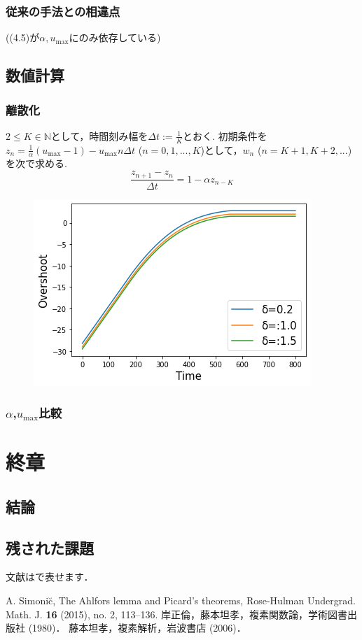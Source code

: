\documentclass [dvipdfmx] {jsarticle}
\numberwithin{equation}{section}
\theoremstyle{definition} %
\theoremstyle{definition} %
\begin{document}
\subsubsection{従来の手法との相違点}
((4.5)が$\alpha,u_{\max}$にのみ依存している)


\subsection{数値計算}


\subsubsection{離散化}
$2\le K\in\mathbb{N}$として，時間刻み幅を$\Delta t:=\frac{1}{K}$とおく.
初期条件を$z_n=\frac{1}{\alpha} (u_{\max}-1)-u_{\max} n \Delta t$ ($n=0,1,...,K$)として，$w_n$ ($n=K+1,K+2,...$)
を次で求める.
\begin{equation}
    \displaystyle\frac{z_{n+1}-z_n}{\Delta t}=1-\alpha z_{n-K}
\end{equation}
\begin{figure}[htbp]
\begin{center}
\includegraphics[scale=0.7]{delta_031015.png}
\end{center}
\end{figure}


\subsubsection{$\alpha$,$u_{\max}$比較}


\section{終章}
\subsection{結論}
\subsection{残された課題}
文献は\cite{Si}で表せます．
\begin{thebibliography}{9}
 A. Simoni\u{c}, The Ahlfors lemma and Picard's theorems, 
Rose-Hulman Undergrad. Math. J. {\bf 16} (2015), no. 2, 113--136. 
 岸正倫，藤本坦孝，複素関数論，学術図書出版社 (1980)．
 藤本坦孝，複素解析，岩波書店 (2006)．


\end{thebibliography}
\end{document}

